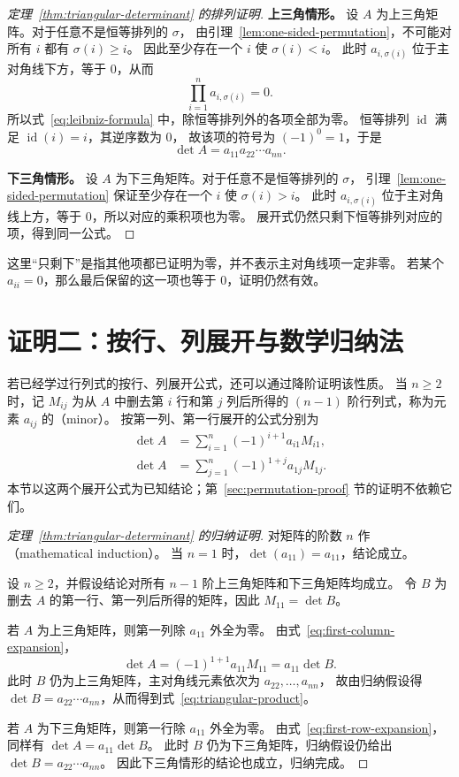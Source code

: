 \documentclass[UTF8,12pt,a4paper,fontset=fandol]{ctexart}
\begin{document}
\begin{proof}[定理~\ref{thm:triangular-determinant} 的排列证明]
\textbf{上三角情形。}
设 $A$ 为上三角矩阵。对于任意不是恒等排列的 $\sigma$，
由引理~\ref{lem:one-sided-permutation}，不可能对所有 $i$ 都有 $\sigma(i)\geq i$。
因此至少存在一个 $i$ 使 $\sigma(i)<i$。
此时 $a_{i,\sigma(i)}$ 位于主对角线下方，等于 $0$，从而
\[
  \prod_{i=1}^{n}a_{i,\sigma(i)}=0.
\]
所以式~\eqref{eq:leibniz-formula} 中，除恒等排列外的各项全部为零。
恒等排列 $\operatorname{id}$ 满足 $\operatorname{id}(i)=i$，其逆序数为 $0$，
故该项的符号为 $(-1)^0=1$，于是
\[
  \det A=a_{11}a_{22}\cdots a_{nn}.
\]

\textbf{下三角情形。}
设 $A$ 为下三角矩阵。对于任意不是恒等排列的 $\sigma$，
引理~\ref{lem:one-sided-permutation} 保证至少存在一个 $i$ 使 $\sigma(i)>i$。
此时 $a_{i,\sigma(i)}$ 位于主对角线上方，等于 $0$，所以对应的乘积项也为零。
展开式仍然只剩下恒等排列对应的项，得到同一公式。
\end{proof}

这里“只剩下”是指其他项都已证明为零，并不表示主对角线项一定非零。
若某个 $a_{ii}=0$，那么最后保留的这一项也等于 $0$，证明仍然有效。

\section{证明二：按行、列展开与数学归纳法}

若已经学过行列式的按行、列展开公式，还可以通过降阶证明该性质。
当 $n\geq2$ 时，记 $M_{ij}$ 为从 $A$ 中删去第 $i$ 行和第 $j$ 列后所得的
$(n-1)$ 阶行列式，称为元素 $a_{ij}$ 的（minor）。
按第一列、第一行展开的公式分别为
\begin{align}
  \det A&=\sum_{i=1}^{n}(-1)^{i+1}a_{i1}M_{i1},
  \label{eq:first-column-expansion}\\
  \det A&=\sum_{j=1}^{n}(-1)^{1+j}a_{1j}M_{1j}.
  \label{eq:first-row-expansion}
\end{align}
本节以这两个展开公式为已知结论；第~\ref{sec:permutation-proof} 节的证明不依赖它们。

\begin{proof}[定理~\ref{thm:triangular-determinant} 的归纳证明]
对矩阵的阶数 $n$ 作（mathematical induction）。
当 $n=1$ 时，$\det(a_{11})=a_{11}$，结论成立。

设 $n\geq2$，并假设结论对所有 $n-1$ 阶上三角矩阵和下三角矩阵均成立。
令 $B$ 为删去 $A$ 的第一行、第一列后所得的矩阵，因此 $M_{11}=\det B$。

若 $A$ 为上三角矩阵，则第一列除 $a_{11}$ 外全为零。
由式~\eqref{eq:first-column-expansion}，
\[
  \det A=(-1)^{1+1}a_{11}M_{11}=a_{11}\det B.
\]
此时 $B$ 仍为上三角矩阵，主对角线元素依次为 $a_{22},\ldots,a_{nn}$，
故由归纳假设得 $\det B=a_{22}\cdots a_{nn}$，从而得到式~\eqref{eq:triangular-product}。

若 $A$ 为下三角矩阵，则第一行除 $a_{11}$ 外全为零。
由式~\eqref{eq:first-row-expansion}，同样有 $\det A=a_{11}\det B$。
此时 $B$ 仍为下三角矩阵，归纳假设仍给出 $\det B=a_{22}\cdots a_{nn}$。
因此下三角情形的结论也成立，归纳完成。
\end{proof}
\end{document}

